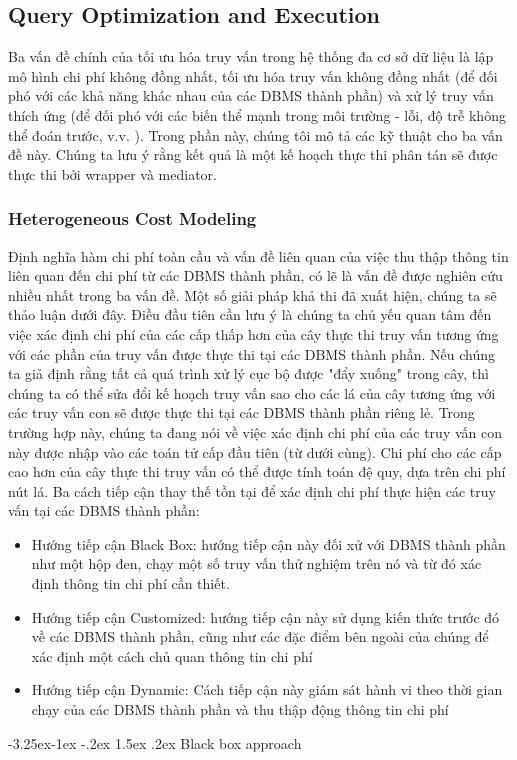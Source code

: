 \documentclass[a4paper]{article}
\makeatletter
\newcounter {subsubsubsection}[subsubsection]
\newcommand\subsubsubsection{\@startsection{subsubsubsection}{4}{\z@}%
                                     {-3.25ex\@plus -1ex \@minus -.2ex}%
                                     {1.5ex \@plus .2ex}%
                                     {\normalfont\normalsize\bfseries}}
\makeatother
\begin{document}
\subsection{Query Optimization and Execution}
Ba vấn đề chính của tối ưu hóa truy vấn trong hệ thống đa cơ sở dữ liệu là lập mô hình chi phí không đồng nhất, tối ưu hóa truy vấn không đồng nhất (để đối phó với các khả năng khác nhau của các DBMS thành phần) và xử lý truy vấn thích ứng (để đối phó với các biến thể mạnh trong môi trường - lỗi, độ trễ không thể đoán trước, v.v. ). Trong phần này, chúng tôi mô tả các kỹ thuật cho ba vấn đề này. Chúng ta lưu ý rằng kết quả là một kế hoạch thực thi phân tán sẽ được thực thi bởi wrapper và mediator.
\subsubsection{Heterogeneous Cost Modeling}
Định nghĩa hàm chi phí toàn cầu và vấn đề liên quan của việc thu thập thông tin liên quan đến chi phí từ các DBMS thành phần, có lẽ là vấn đề được nghiên cứu nhiều nhất trong ba vấn đề. Một số giải pháp khả thi đã xuất hiện, chúng ta sẽ thảo luận dưới đây. Điều đầu tiên cần lưu ý là chúng ta chủ yếu quan tâm đến việc xác định chi phí của các cấp thấp hơn của cây thực thi truy vấn tương ứng với các phần của truy vấn được thực thi tại các DBMS thành phần. Nếu chúng ta giả định rằng tất cả quá trình xử lý cục bộ được "đẩy xuống" trong cây, thì chúng ta có thể sửa đổi kế hoạch truy vấn sao cho các lá của cây tương ứng với các truy vấn con sẽ được thực thi tại các DBMS thành phần riêng lẻ. Trong trường hợp này, chúng ta đang nói về việc xác định chi phí của các truy vấn con này được nhập vào các toán tử cấp đầu tiên (từ dưới cùng). Chi phí cho các cấp cao hơn của cây thực thi truy vấn có thể được tính toán đệ quy, dựa trên chi phí nút lá. Ba cách tiếp cận thay thế tồn tại để xác định chi phí thực hiện các truy vấn tại các DBMS thành phần:
\begin{itemize}
    \item Hướng tiếp cận Black Box: hướng tiếp cận này đối xử với DBMS thành phần như một hộp đen, chạy một số truy vấn thử nghiệm trên nó và từ đó xác định thông tin chi phí cần thiết.
    \item Hướng tiếp cận Customized: hướng tiếp cận này sử dụng kiến thức trước đó về các DBMS thành phần, cũng như các đặc điểm bên ngoài của chúng để xác định một cách chủ quan thông tin chi phí
    \item Hướng tiếp cận Dynamic: Cách tiếp cận này giám sát hành vi theo thời gian chạy của các DBMS thành phần và thu thập động thông tin chi phí
\end{itemize}
\subsubsubsection{Black box approach}
\end{document}
